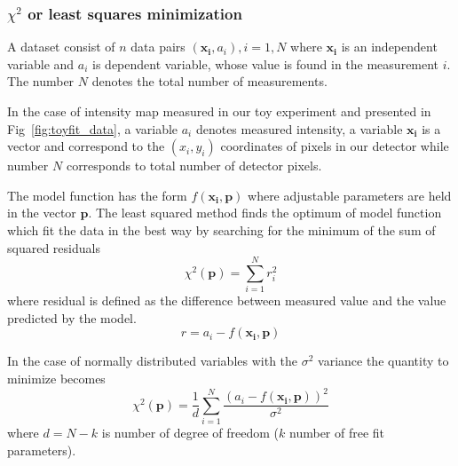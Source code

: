 \subsubsection*{$\chi^2$ or least squares minimization}
A dataset consist of $n$ data pairs $(\mathbf{x_{i}}, a_{i}), i=1,N$ where 
$\mathbf{x_{i}}$ is an independent variable and $a_{i}$ is dependent variable, whose
value is found in the measurement $i$. The number $N$ denotes the total
number of measurements. 

In the case of intensity map measured in our toy experiment 
and presented in Fig~\ref{fig:toyfit_data}, a variable $a_{i}$ denotes measured intensity, a variable $\mathbf{x_{i}}$ is a vector and correspond to the 
$(x_{i}, y_{i})$ coordinates of pixels in our detector while number $N$  corresponds 
to total number of detector pixels.

The model function has the form
$f(\mathbf{x_{i}},\mathbf{p})$
where adjustable parameters are held in the vector $\mathbf{p}$.
The least squared method finds the optimum of model function which 
fit the data in the best way by searching for the minimum of the sum of squared
residuals
$$ \chi^{2}(\mathbf{p}) = \sum_{i=1}^{N}r_{i}^{2}$$
where residual is defined as the difference between measured value and the value predicted by the model.
$$r = a_{i} - f(\mathbf{x_{i}},\mathbf{p})$$

In the case of normally distributed variables with the $\sigma^2$ variance
the quantity to minimize becomes
$$ \chi^{2}(\mathbf{p}) =
\frac{1}{d}
\sum_{i=1}^{N}  
\frac{ (a_{i} - f(\mathbf{x_{i}},\mathbf{p}))^2}{\sigma^2}   $$
where $d=N-k$ is number of degree of freedom ($k$ number of free fit parameters).


